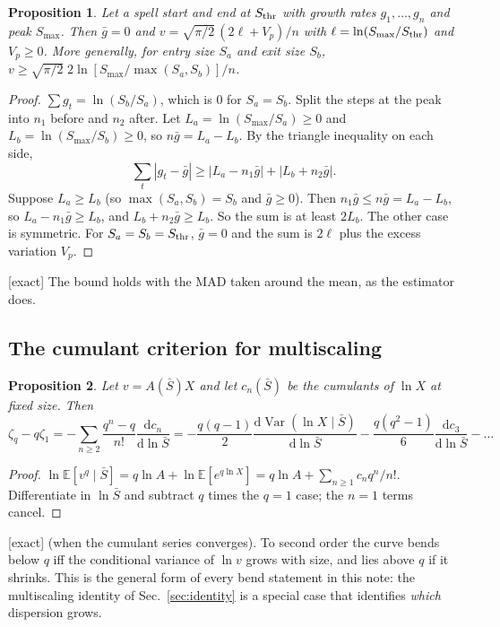 \documentclass[11pt]{article}
\newcommand{\E}{\mathbb E}
\newcommand{\Var}{\operatorname{Var}}
\newcommand{\Sb}{\bar S}
\newcommand{\dd}{\mathrm d}
\newcommand{\exact}{\textsf{\small[exact]}}
\newtheorem{proposition}{Proposition}
\begin{document}
\begin{proposition}
Let a spell start and end at $S_{\rm thr}$ with growth rates $g_1,\dots,g_n$ and peak $S_{\max}$.  Then $\bar g=0$ and
$v=\sqrt{\pi/2}\,(2\ell+V_p)/n$ with $\ell=\ln(S_{\max}/S_{\rm thr})$ and $V_p\ge0$.  More generally, for entry size $S_a$ and exit
size $S_b$, $v\ge\sqrt{\pi/2}\;2\ln[S_{\max}/\max(S_a,S_b)]/n$.
\end{proposition}
\begin{proof}
$\sum g_t=\ln(S_b/S_a)$, which is $0$ for $S_a=S_b$.  Split the steps at the peak into $n_1$ before and $n_2$ after.  Let
$L_a=\ln(S_{\max}/S_a)\ge0$ and $L_b=\ln(S_{\max}/S_b)\ge0$, so $n\bar g=L_a-L_b$.  By the triangle inequality on each side,
\begin{equation}
\sum_t|g_t-\bar g|\ge|L_a-n_1\bar g|+|L_b+n_2\bar g| .
\end{equation}
Suppose $L_a\ge L_b$ (so $\max(S_a,S_b)=S_b$ and $\bar g\ge0$).  Then $n_1\bar g\le n\bar g=L_a-L_b$, so $L_a-n_1\bar g\ge L_b$, and
$L_b+n_2\bar g\ge L_b$.  So the sum is at least $2L_b$.  The other case is symmetric.  For $S_a=S_b=S_{\rm thr}$, $\bar g=0$ and the
sum is $2\ell$ plus the excess variation $V_p$.
\end{proof}
\exact{}  The bound holds with the MAD taken around the mean, as the estimator does.

\subsection{The cumulant criterion for multiscaling}
\label{sec:cumulant}

\begin{proposition}
Let $v=A(\Sb)X$ and let $c_n(\Sb)$ be the cumulants of $\ln X$ at fixed size.  Then
\begin{equation}
\zeta_q-q\zeta_1=-\sum_{n\ge2}\frac{q^n-q}{n!}\frac{\dd c_n}{\dd\ln\Sb}=-\frac{q(q-1)}2\frac{\dd\Var(\ln X\mid\Sb)}{\dd\ln\Sb}-\frac{q(q^2-1)}{6}\frac{\dd c_3}{\dd\ln\Sb}-\dots
\end{equation}
\end{proposition}
\begin{proof}
$\ln\E[v^q\mid\Sb]=q\ln A+\ln\E[e^{q\ln X}]=q\ln A+\sum_{n\ge1}c_nq^n/n!$.  Differentiate in $\ln\Sb$ and subtract $q$ times the $q=1$
case; the $n=1$ terms cancel.
\end{proof}
\exact{} (when the cumulant series converges).  To second order the curve bends below $q$ iff the conditional variance of
$\ln v$ grows with size, and lies above $q$ if it shrinks.  This is the general form of every bend statement in this note: the
multiscaling identity of Sec.~\ref{sec:identity} is a special case that identifies \emph{which} dispersion grows.
\end{document}
